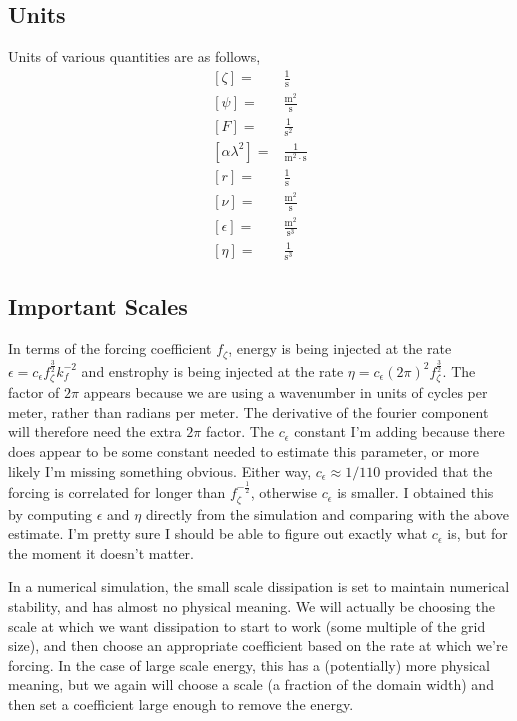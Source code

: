 \documentclass[11pt]{article}
\begin{document}
%
\subsection{Units}
%

Units of various quantities are as follows,
\begin{align}
\left[ \zeta \right] =& \frac{1}{\textrm{s}} \\
\left[ \psi \right] =& \frac{\textrm{m}^2}{\textrm{s}} \\
\left[ F \right] =& \frac{1}{\textrm{s}^2} \\
\left[ \alpha \lambda^2 \right] =& \frac{1}{\textrm{m}^2\cdot\textrm{s}} \\
\left[ r \right] =& \frac{1}{\textrm{s}} \\
\left[ \nu \right] =& \frac{\textrm{m}^2}{\textrm{s}} \\
\left[ \epsilon \right] =& \frac{\textrm{m}^2}{\textrm{s}^3}\\
\left[ \eta \right] =& \frac{1}{\textrm{s}^3}
\end{align} 

%
\subsection{Important Scales}
%

In terms of the forcing coefficient $f_\zeta$, energy is being injected at the rate $\epsilon=c_\epsilon f_\zeta^{\frac{3}{2}} k_f^{-2}$ and enstrophy is being injected at the rate $\eta= c_\epsilon (2\pi)^2 f_\zeta^{\frac{3}{2}}$. The factor of $2\pi$ appears because we are using a wavenumber in units of cycles per meter, rather than radians per meter. The derivative of the fourier component will therefore need the extra $2 \pi$ factor. The $c_\epsilon$ constant I'm adding because there does appear to be some constant needed to estimate this parameter, or more likely I'm missing something obvious. Either way, $c_\epsilon\approx 1/110$ provided that the forcing is correlated for longer than $f_\zeta^{-\frac{1}{2}}$, otherwise $c_\epsilon$ is smaller. I obtained this by computing $\epsilon$ and $\eta$ directly from the simulation and comparing with the above estimate. I'm pretty sure I should be able to figure out exactly what $c_\epsilon$ is, but for the moment it doesn't matter.

In a numerical simulation, the small scale dissipation is set to maintain numerical stability, and has almost no physical meaning. We will actually be choosing the scale at which we want dissipation to start to work (some multiple of the grid size), and then choose an appropriate coefficient based on the rate at which we're forcing. In the case of large scale energy, this has a (potentially) more physical meaning, but we again will choose a scale (a fraction of the domain width) and then set a coefficient large enough to remove the energy.
\end{document}

